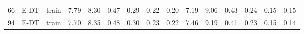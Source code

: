 \begin{table}
\begin{tabular}{@{\hskip3pt}c@{\hskip3pt}c@{\hskip3pt}c@{\hskip3pt}c@{\hskip3pt}c@{\hskip3pt}c@{\hskip3pt}c@{\hskip3pt}c@{\hskip3pt}c@{\hskip3pt}c@{\hskip3pt}c@{\hskip3pt}c@{\hskip3pt}c@{\hskip3pt}c@{\hskip3pt}c}
         66 &           E-DT &                     train &              7.79 &        8.30 &          0.47 &        0.29 &        0.22 &         0.20 &                7.19 &        9.06 &          0.43 &        0.24 &        0.15 &         0.15 \\
         94 &           E-DT &                     train &              7.70 &        8.35 &          0.48 &        0.30 &        0.23 &         0.22 &                7.46 &        9.19 &          0.41 &        0.23 &        0.15 &         0.14 \\
\bottomrule
\end{tabular}
\end{table}
